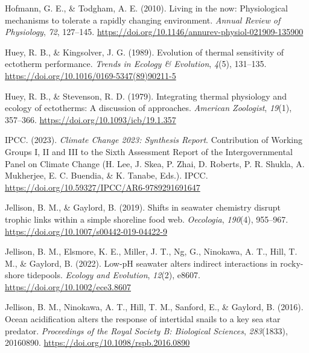 \documentclass{CSUNthesis}
\begin{document}
\vspace{0.1em}

Hofmann, G. E., \& Todgham, A. E. (2010). Living in the now: Physiological mechanisms to tolerate a rapidly changing environment. \textit{Annual Review of Physiology}, \textit{72}, 127--145. \url{https://doi.org/10.1146/annurev-physiol-021909-135900}

\vspace{0.1em}

Huey, R. B., \& Kingsolver, J. G. (1989). Evolution of thermal sensitivity of ectotherm performance. \textit{Trends in Ecology \& Evolution}, \textit{4}(5), 131--135. \url{https://doi.org/10.1016/0169-5347(89)90211-5}

\vspace{0.1em}

Huey, R. B., \& Stevenson, R. D. (1979). Integrating thermal physiology and ecology of ectotherms: A discussion of approaches. \textit{American Zoologist}, \textit{19}(1), 357--366. \url{https://doi.org/10.1093/icb/19.1.357}

\vspace{0.1em}

IPCC. (2023). \textit{Climate Change 2023: Synthesis Report}. Contribution of Working Groups I, II and III to the Sixth Assessment Report of the Intergovernmental Panel on Climate Change (H. Lee, J. Skea, P. Zhai, D. Roberts, P. R. Shukla, A. Mukherjee, E. C. Buendia, \& K. Tanabe, Eds.). IPCC. \url{https://doi.org/10.59327/IPCC/AR6-9789291691647}

\vspace{0.1em}

Jellison, B. M., \& Gaylord, B. (2019). Shifts in seawater chemistry disrupt trophic links within a simple shoreline food web. \textit{Oecologia}, \textit{190}(4), 955--967. \url{https://doi.org/10.1007/s00442-019-04422-9}

\vspace{0.1em}

Jellison, B. M., Elsmore, K. E., Miller, J. T., Ng, G., Ninokawa, A. T., Hill, T. M., \& Gaylord, B. (2022). Low-pH seawater alters indirect interactions in rocky-shore tidepools. \textit{Ecology and Evolution}, \textit{12}(2), e8607. \url{https://doi.org/10.1002/ece3.8607}

\vspace{0.1em}

Jellison, B. M., Ninokawa, A. T., Hill, T. M., Sanford, E., \& Gaylord, B. (2016). Ocean acidification alters the response of intertidal snails to a key sea star predator. \textit{Proceedings of the Royal Society B: Biological Sciences}, \textit{283}(1833), 20160890. \url{https://doi.org/10.1098/rspb.2016.0890}
\end{document}
